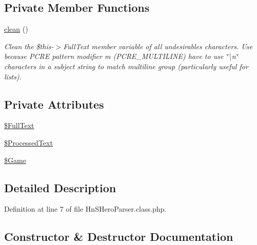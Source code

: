 \subsection*{Private Member Functions}
\begin{DoxyCompactItemize}
\item 
\hyperlink{class_hn_s_hero_parser_aac2dc1befb5a88823cb1fdacaa170448}{clean} ()
\begin{DoxyCompactList}\small\item\em Clean the \$this-\/$>$Full\+Text member variable of all undesirables characters. Use because P\+C\+RE pattern modifier m (P\+C\+R\+E\+\_\+\+M\+U\+L\+T\+I\+L\+I\+NE) have to use \char`\"{}\textbackslash{}n\char`\"{} characters in a subject string to match multiline group (particularly useful for lists). \end{DoxyCompactList}\end{DoxyCompactItemize}
\subsection*{Private Attributes}
\begin{DoxyCompactItemize}
\item 
\hyperlink{class_hn_s_hero_parser_a0aad0d7255ca2726509e3d09f9f9e00d}{\$\+Full\+Text}
\item 
\hyperlink{class_hn_s_hero_parser_a1610749a8619f93b7a8315fbd0f18037}{\$\+Processed\+Text}
\item 
\hyperlink{class_hn_s_hero_parser_a7deea68c90514b8307ebf40a994e1744}{\$\+Game}
\end{DoxyCompactItemize}


\subsection{Detailed Description}


Definition at line 7 of file Hn\+S\+Hero\+Parser.\+class.\+php.



\subsection{Constructor \& Destructor Documentation}
\mbox{\label{class_hn_s_hero_parser_abaa66274b27ad652c5cc1ec9664d6c87}} 

